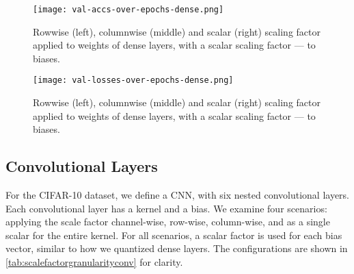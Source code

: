 \begin{figure}[b!]
  \centering
  \texttt{[image: val-accs-over-epochs-dense.png]}
  \caption{Rowwise (left), columnwise (middle) and scalar (right) scaling factor applied to weights of dense layers, with a scalar scaling factor — to biases.}
  \label{fig:val-accs-over-epochs-dense}
\end{figure}

\begin{figure}[h!]
  \centering
  \texttt{[image: val-losses-over-epochs-dense.png]}
  \caption{Rowwise (left), columnwise (middle) and scalar (right) scaling factor applied to weights of dense layers, with a scalar scaling factor — to biases.}
  \label{fig:val-losses-over-epochs-dense}
\end{figure}
  
\subsection{Convolutional Layers}
\label{subsec:convolutionallayers}
\hspace*{1em}For the CIFAR-10 dataset, we define a CNN, with six nested convolutional layers. 
Each convolutional layer has a kernel and a bias. We examine four scenarios:
applying the scale factor channel-wise, row-wise, column-wise, and as a single
scalar for the entire kernel. For all scenarios, a scalar factor is used for each 
bias vector, similar to how we quantized dense layers. The configurations are shown in
\cref{tab:scalefactorgranularityconv} for clarity.

